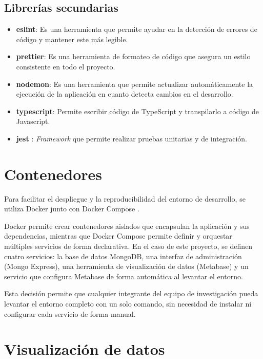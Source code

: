 \documentclass[12pt,letterpaper,oneside]{report}
\begin{document}
\subsection{Librer\'ias secundarias}
\label{sec:librerias-secundarias}

\begin{itemize}
  \item \textbf{eslint}: Es una herramienta que permite ayudar en la detecci\'on de errores de c\'odigo y mantener este m\'as legible.
  \item \textbf{prettier}: Es una herramienta de formateo de c\'odigo que asegura un estilo consistente en todo el proyecto.
  \item \textbf{nodemon}: Es una herramienta que permite actualizar autom\'aticamente la ejecuci\'on de la aplicaci\'on en cuanto detecta cambios en el desarrollo.
  \item \textbf{typescript}: Permite escribir c\'odigo de TypeScript y transpilarlo a c\'odigo de Javascript.
  \item \textbf{jest} \parencite{jest}: \textit{Framework} que permite realizar pruebas unitarias y de integraci\'on.
\end{itemize}

\section{Contenedores}
\label{sec:contenedores}

Para facilitar el despliegue y la reproducibilidad del entorno de desarrollo, se utiliza Docker junto con Docker Compose \parencite{docker}.

Docker permite crear contenedores aislados que encapsulan la aplicaci\'on y sus dependencias, mientras que Docker Compose permite definir y orquestar m\'ultiples servicios de forma declarativa. En el caso de este proyecto, se definen cuatro servicios: la base de datos MongoDB, una interfaz de administraci\'on (Mongo Express), una herramienta de visualizaci\'on de datos (Metabase) y un servicio que configura Metabase de forma autom\'atica al levantar el entorno.

Esta decisi\'on permite que cualquier integrante del equipo de investigaci\'on pueda levantar el entorno completo con un solo comando, sin necesidad de instalar ni configurar cada servicio de forma manual.

\section{Visualizaci\'on de datos}
\label{sec:visualizacion}
\end{document}
